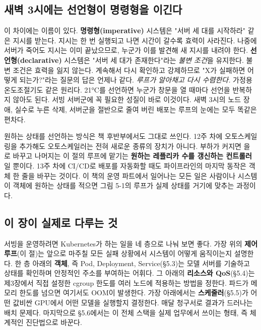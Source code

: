 \subsection*{새벽 3시에는 선언형이 명령형을 이긴다}

이 차이에는 이름이 있다. \textbf{명령형(imperative)} 시스템은 "서버 세 대를 시작하라" 같은 지시를 받는다. 지시는 한 번 실행되고 나면 시간이 갈수록 효력이 사라진다. 나중에 서버가 죽어도 지시는 이미 끝났으므로, 누군가 이를 발견해 새 지시를 내려야 한다. \textbf{선언형(declarative)} 시스템은 "서버 세 대가 존재한다"라는 \textit{불변 조건}을 유지한다. 불변 조건은 효력을 잃지 않는다. 계속해서 다시 확인하고 강제하므로 "X가 실패하면 어떻게 되는가?"라는 질문의 답은 언제나 같다. \textit{루프가 알아채고 다시 수렴한다.} 가정용 온도조절기도 같은 원리다. 21°C를 선언하면 누군가 창문을 열 때마다 선언을 반복하지 않아도 된다. 서빙 서버군에 꼭 필요한 성질이 바로 이것이다. 새벽 3시의 노드 장애, 실수로 누른 삭제, 서버군을 절반으로 줄여 버린 배포는 루프의 눈에는 모두 똑같은 편차다.

원하는 상태를 선언하는 방식은 책 후반부에서도 그대로 쓰인다. 12주 차에 오토스케일링을 추가해도 오토스케일러는 전혀 새로운 종류의 장치가 아니다. 부하가 커지면 을 로 바꾸고 나머지는 이 절의 루프에 맡기는 \textbf{원하는 레플리카 수를 갱신하는 컨트롤러}일 뿐이다. 13주 차에 CI/CD로 배포를 자동화할 때도 파이프라인의 마지막 동작은 객체 한 줄을 바꾸는 것이다. 이 책의 운영 파트에서 일어나는 모든 일은 사람이나 시스템이 객체에 원하는 상태를 적으면 그림 5-1의 루프가 실제 상태를 거기에 맞추는 과정이다.

\subsection*{이 장이 실제로 다루는 것}

서빙을 운영하려면 Kubernetes가 하는 일을 네 층으로 나눠 보면 좋다. 가장 위의 \textbf{제어 루프}(이 절)는 앞으로 마주칠 모든 실패 상황에서 시스템이 어떻게 움직이는지 설명한다. 한 층 아래의 \textbf{객체}, 즉 Pod, Deployment, Service(§5.3)는 모델 서버를 기술하고 상태를 확인하며 안정적인 주소를 부여하는 어휘다. 그 아래의 \textbf{리소스와 QoS}(§5.4)는 제3장에서 직접 설정한 cgroup 한도를 여러 노드에 적용하는 방법을 정한다. 파드가 메모리 한도를 넘으면 여기서도 OOM이 발생한다. 가장 아래에서는 \textbf{스케줄러}(§5.5)가 어떤 값비싼 GPU에서 어떤 모델을 실행할지 결정한다. 매달 청구서로 결과가 드러나는 배치 문제다. 마지막으로 §5.6에서는 이 전체 스택을 실제 업무에서 쓰이는 형태, 즉 체계적인 진단법으로 바꾼다.

